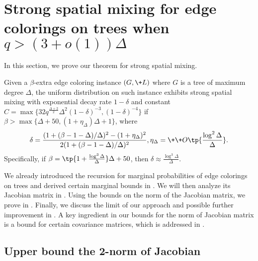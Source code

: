 \section{Strong spatial mixing for edge colorings on trees when $q>(3+o(1))\Delta$}\label{sec:ssm}

In this section, we prove our theorem for strong spatial mixing.

\begin{theorem}\label{thm:SSM}
    Given a $\beta$-extra edge coloring instance $(G,\+L)$ where $G$ is a tree of maximum degree $\Delta$, the uniform distribution on such instance exhibits strong spatial mixing with exponential decay rate $1-\delta$ and constant $C = \max\{32q^{\frac{\Delta + 2}2}\Delta^2(1-\delta)^{-3},(1-\delta)^{-4}\}$ if $\beta > \max\{\Delta + 50, (1 + \eta_\Delta)\Delta + 1\}$, where
    \[
         \delta = \frac{(1 + (\beta - 1 -\Delta)/\Delta)^2 - (1+\eta_{\Delta})^2}{2(1 + (\beta - 1 -\Delta)/\Delta)^2}, \eta_{\Delta} = \+\+O\tp{\frac{\log^2 \Delta}{\Delta}}.
    \]
    Specifically, if $\beta = \tp{1 + \frac{\log^3 \Delta}{\Delta}}\Delta + 50$, then $\delta \approx \frac{\log^3 \Delta}{\Delta}$.
 \end{theorem}
 

We already introduced the recursion for marginal probabilities of edge colorings on trees and derived certain marginal bounds in .  We will then analyze its Jacobian matrix in . Using the bounds on the norm of the Jacobian matrix, we prove  in . Finally, we discuss the limit of our approach and possible further improvement in . A key ingredient in our bounds for the norm of Jacobian matrix is a bound for certain covariance matrices, which is addressed in . 

\subsection{Upper bound the 2-norm of Jacobian}\label{sec:jacobian}

